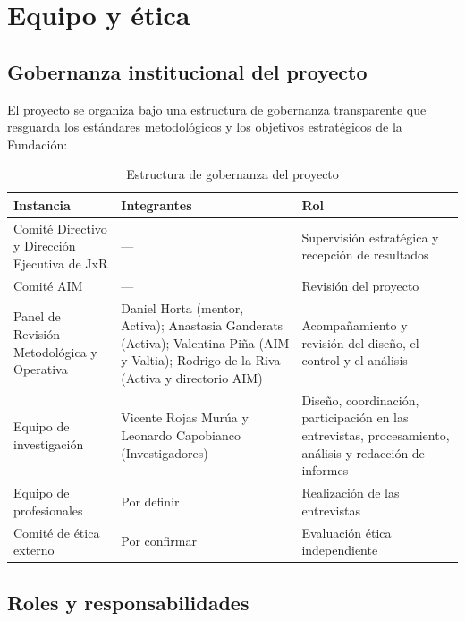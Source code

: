 \section{Equipo y ética}

\subsection{Gobernanza institucional del proyecto}

El proyecto se organiza bajo una estructura de gobernanza transparente que resguarda los estándares metodológicos y los objetivos estratégicos de la Fundación:

\begin{table}[ht]
\centering
\small
\caption{Estructura de gobernanza del proyecto}
\label{tab:gobernanza}
\begin{tabular}{p{4cm}p{5.2cm}p{4.8cm}}
\hline
\textbf{Instancia} & \textbf{Integrantes} & \textbf{Rol} \\
\hline
Comité Directivo y Dirección Ejecutiva de JxR & --- & Supervisión estratégica y recepción de resultados \\
Comité AIM & --- & Revisión del proyecto \\
Panel de Revisión Metodológica y Operativa & Daniel Horta (mentor, Activa); Anastasia Ganderats (Activa); Valentina Piña (AIM y Valtia); Rodrigo de la Riva (Activa y directorio AIM) & Acompañamiento y revisión del diseño, el control y el análisis \\
Equipo de investigación & Vicente Rojas Murúa y Leonardo Capobianco (Investigadores) & Diseño, coordinación, participación en las entrevistas, procesamiento, análisis y redacción de informes \\
Equipo de profesionales & Por definir & Realización de las entrevistas \\
Comité de ética externo & Por confirmar & Evaluación ética independiente \\
\hline
\end{tabular}
\end{table}

\subsection{Roles y responsabilidades}

